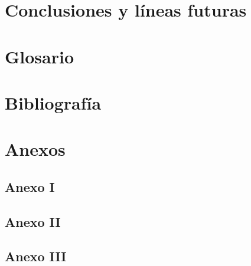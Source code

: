 \documentclass[12pt]{article}
\begin{document}
	\section[Conclusiones y líneas futuras]{Conclusiones y líneas futuras}
	
	\section*{Glosario}
	
	\section*{Bibliografía}
	
	\section*{Anexos}
	
	\subsection*{Anexo I}
	
	\subsection*{Anexo II}
	
	\subsection*{Anexo III}
	\label{subsection: presupuesto}
	
	
\end{document}

